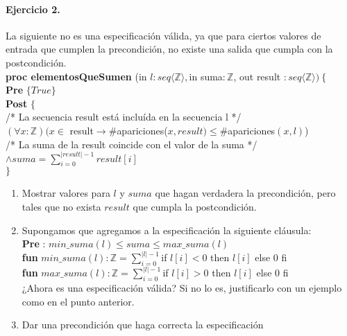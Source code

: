 \documentclass[a4paper]{article}
\begin{document}
\paragraph*{Ejercicio 2.} La siguiente no es una especificación válida, ya que para ciertos valores de entrada que cumplen la precondición, no existe una salida que cumpla con la postcondición.\medskip \\
\textbf{proc elementosQueSumen }(in $l:seq\langle \mathbb{Z}\rangle,$in suma$:\mathbb{Z}$, out result $:seq\langle \mathbb{Z}\rangle)\ \{$\\
\hspace*{6mm}\textbf{Pre }$\{True\}$\\
\hspace*{6mm}\textbf{Post }$\{$\\
\hspace*{6mm}/* La secuencia result está incluída en la secuencia l */\\
\hspace*{6mm}$(\forall x:\mathbb{Z})(x\in $ result$ \rightarrow \#$apariciones($x,result)\leq \#$apariciones$(x,l)$)\\
\hspace*{6mm}/* La suma de la result coincide con el valor de la suma */\\
\hspace*{6mm}$\wedge suma=\sum_{i=0}^{|result|-1}result[i]$\\
\hspace*{6mm}$\}$\\
	\begin{enumerate}[label=\alph*)]
		\item Mostrar valores para $l$ y $suma$ que hagan verdadera la precondición, pero tales que no exista $result$ que cumpla la postcondición.
		\item Supongamos que agregamos a la especificación la siguiente cláusula:\smallskip \\
		\hspace*{4mm} \textbf{Pre} : $min\_suma(l)\leq suma\leq max\_suma(l)$\\
		\hspace*{4mm} \textbf{fun} $min\_suma(l):\mathbb{Z}=\sum_{i=0}^{|l|-1}$if $l[i]<0$ then $l[i]$ else 0 fi\\
		\hspace*{4mm} \textbf{fun} $max\_suma(l):\mathbb{Z}=\sum_{i=0}^{|l|-1}$if $l[i]>0$ then $l[i]$ else 0 fi\smallskip \\
		¿Ahora es una especificación válida? Si no lo es, justificarlo con un ejemplo como en el punto anterior.
		\item Dar una precondición que haga correcta la especificación
	\end{enumerate}
\end{document}
